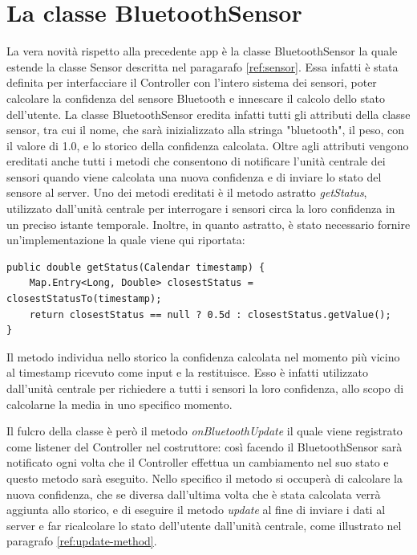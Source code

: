 \section{La classe BluetoothSensor}\label{chap:btSensor}
La vera novità rispetto alla precedente app è la classe BluetoothSensor la quale estende la classe Sensor descritta nel paragarafo \ref{ref:sensor}. Essa infatti è stata definita per interfacciare il Controller con l'intero sistema dei sensori, poter calcolare la confidenza del sensore Bluetooth e innescare il calcolo dello stato dell'utente. La classe BluetoothSensor eredita infatti tutti gli attributi della classe sensor, tra cui il nome, che sarà inizializzato alla stringa "bluetooth", il peso, con il valore di 1.0, e lo storico della confidenza calcolata. Oltre agli attributi vengono ereditati anche tutti i metodi che consentono di notificare l'unità centrale dei sensori quando viene calcolata una nuova confidenza e di inviare lo stato del sensore al server. Uno dei metodi ereditati è il metodo astratto \textit{getStatus}, utilizzato dall'unità centrale per interrogare i sensori circa la loro confidenza in un preciso istante temporale. Inoltre, in quanto astratto, è stato necessario fornire un'implementazione la quale viene qui riportata:
\begin{verbatim}
public double getStatus(Calendar timestamp) {
    Map.Entry<Long, Double> closestStatus = closestStatusTo(timestamp);
    return closestStatus == null ? 0.5d : closestStatus.getValue();
}
\end{verbatim}
Il metodo individua nello storico la confidenza calcolata nel momento più vicino al timestamp ricevuto come input e la restituisce. Esso è infatti utilizzato dall'unità centrale per richiedere a tutti i sensori la loro confidenza, allo scopo di calcolarne la media in uno specifico momento.

Il fulcro della classe è però il metodo \textit{onBluetoothUpdate} il quale viene registrato come listener del Controller nel costruttore: così facendo il BluetoothSensor sarà notificato ogni volta che il Controller effettua un cambiamento nel suo stato e questo metodo sarà eseguito. Nello specifico il metodo si occuperà di calcolare la nuova confidenza, che se diversa dall'ultima volta che è stata calcolata verrà aggiunta allo storico, e di eseguire il metodo \textit{update} al fine di inviare i dati al server e far ricalcolare lo stato dell'utente dall'unità centrale, come illustrato nel paragrafo \ref{ref:update-method}.

